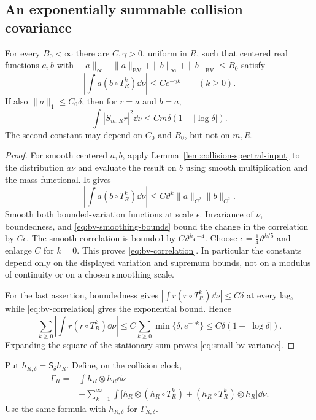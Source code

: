 \subsection{An exponentially summable collision covariance}
\begin{proposition}
\label{prop:bv-correlation}
For every $B_0<\infty$ there are $C,\gamma>0$, uniform in $R$, such
that centered real functions $a,b$ with
$\|a\|_\infty+\|a\|_{\mathrm{BV}}+
\|b\|_\infty+\|b\|_{\mathrm{BV}}\le B_0$ satisfy
\begin{equation}\label{eq:bv-correlation}
 \left|\int a(b\circ T_R^k)\dd\nu\right|\le Ce^{-\gamma k}
 \qquad(k\ge0).
\end{equation}
If also $\|a\|_1\le C_0\delta$, then for $r=a$ and $b=a$,
\begin{equation}\label{eq:small-bv-variance}
 \int|S_{m,R}r|^2\dd\nu
       \le C m\delta(1+|\log\delta|).
\end{equation}
The second constant may depend on $C_0$ and $B_0$, but not on $m,R$.
\end{proposition}
\begin{proof}
For smooth centered $a,b$, apply Lemma~\ref{lem:collision-spectral-input}
to the distribution $a\nu$ and evaluate the result on $b$ using smooth
multiplication and the mass functional. It gives
\[
 \left|\int a(b\circ T_R^k)\dd\nu\right|
       \le C\vartheta^k\|a\|_{C^2}\|b\|_{C^2}.
\]
Smooth both bounded-variation functions at scale $\epsilon$. Invariance
of $\nu$, boundedness, and \eqref{eq:bv-smoothing-bounds} bound the
change in the correlation by $C\epsilon$. The smooth correlation is
bounded by $C\vartheta^k\epsilon^{-4}$. Choose
$\epsilon=\tfrac14\vartheta^{k/5}$ and enlarge $C$ for $k=0$.
This proves \eqref{eq:bv-correlation}. In particular the constants depend
only on the displayed variation and supremum bounds, not on a modulus
of continuity or on a chosen smoothing scale.

For the last assertion, boundedness gives
$|\int r(r\circ T_R^k)\dd\nu|\le C\delta$ at every lag, while
\eqref{eq:bv-correlation} gives the exponential bound. Hence
\[
 \sum_{k\ge0}\left|\int r(r\circ T_R^k)\dd\nu\right|
       \le C\sum_{k\ge0}\min\{\delta,e^{-\gamma k}\}
       \le C\delta(1+|\log\delta|).
\]
Expanding the square of the stationary sum proves
\eqref{eq:small-bv-variance}.
\end{proof}

Put $h_{R,\delta}=\mathsf S_\delta h_R$. Define, on the collision clock,
\begin{equation}\label{eq:collision-gk}
 \begin{split}
 \Gamma_R={}&\int h_R\otimes h_R\dd\nu\\
 &+\sum_{k=1}^{\infty}\int
 \bigl[h_R\otimes(h_R\circ T_R^k)
       +(h_R\circ T_R^k)\otimes h_R\bigr]\dd\nu .
 \end{split}
\end{equation}
Use the same formula with $h_{R,\delta}$ for $\Gamma_{R,\delta}$.


